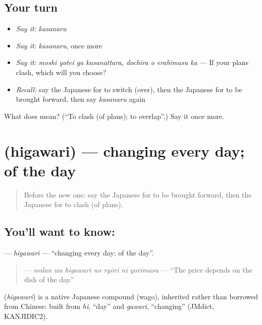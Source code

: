 \subsection*{Your turn}
\begin{itemize}
\raggedright
  \item \emph{Say it:} \emph{kasanaru}
  \item \emph{Say it:} \emph{kasanaru}, once more
  \item \emph{Say it:} \emph{moshi yotei ga kasanattara, dochira o erabimasu ka} — If your plans clash, which will you choose?
  \item \emph{Recall:} say the Japanese for to switch (over), then the Japanese for to be brought forward, then say \emph{kasanaru} again
\end{itemize}

\begin{tcolorbox}[breakable,colback=teal!4,colframe=teal!35!black,title={Before you move on}]
What does  mean? (\textquotedblleft{}To clash (of plans); to overlap\textquotedblright{}.) Say it once more.
\end{tcolorbox}
\section[\texorpdfstring{\ja{ひがわり} (higawari)}{ひがわり (higawari)}]{ (higawari) — changing every day; of the day}

\label{lesson:JA-C512-higawari}



\begin{quote}
Before the new one: say the Japanese for to be brought forward, then the Japanese for to clash (of plans).
\end{quote}

\subsection*{You'll want to know: }
\textbf{} — \emph{higawari} — \textquotedblleft{}changing every day; of the day\textquotedblright{}.

\begin{quote}
\textbf{   } — \emph{nedan wa higawari no ryōri ni yorimasu} — \textquotedblleft{}The price depends on the dish of the day.\textquotedblright{}
\end{quote}

\begin{cousinweb}
\textbf{} (\emph{higawari}) is a native Japanese compound (wago), inherited rather than borrowed from Chinese: built from \emph{hi}, \textquotedblleft{}day\textquotedblright{} and \emph{gawari}, \textquotedblleft{}changing\textquotedblright{} (JMdict, KANJIDIC2).
\end{cousinweb}

